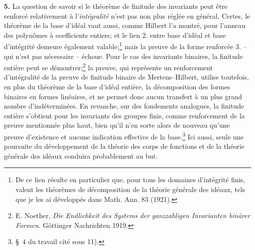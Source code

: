 \textbf{5.} La question de savoir si le théorème de finitude des invariants peut être renforcé relativement à l'\emph{intégralité} n'est pas non plus réglée en général. Certes, le théorème de la base d'idéal vaut aussi, comme Hilbert l'a montré, pour l'anneau des polynômes à coefficients entiers; et le lien 2. entre base d'idéal et base d'intégrité demeure également valable;\footnote{De ce lien résulte en particulier que, pour tous les domaines d’intégrité finis, valent les théorèmes de décomposition de la théorie générale des idéaux, tels que je les ai développés dans Math. Ann. 83 (1921).} mais la preuve de la forme renforcée 3. -- qui n'est pas nécessaire -- échoue. Pour le cas des invariants binaires, la finitude entière peut se démontrer;\footnote{E. Noether, \emph{Die Endlichkeit des Systems der ganzzahligen Invarianten binärer Formen}. Göttinger Nachrichten 1919.} la preuve, qui représente un renforcement d'intégralité de la preuve de finitude binaire de Mertens--Hilbert, utilise toutefois, en plus du théorème de la base d'idéal entière, la décomposition des formes binaires en formes linéaires, et ne permet donc aucun transfert à un plus grand nombre d'indéterminées. En revanche, sur des fondements analogues, la finitude entière s'obtient pour les invariants des groupes finis, comme renforcement de la preuve mentionnée plus haut, bien qu'il n'en sorte alors de nouveau qu'une preuve d'existence et aucune indication effective de la base.\footnote{\S\ 4 du travail cité sous 11).} Ici aussi, seule une poursuite du développement de la théorie des corps de fonctions et de la théorie générale des idéaux conduira probablement au but.

